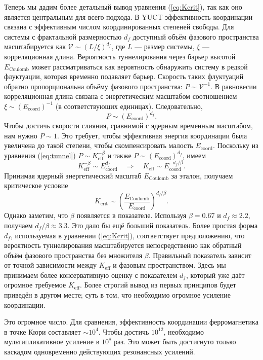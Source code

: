\documentclass[12pt]{article}
\theoremstyle{remark}
\newcommand{\Keff}{K_{\mathrm{eff}}}
\newcommand{\df}{d_{\!f}}
\newcommand{\Kcrit}{K_{\mathrm{crit}}}
\begin{document}
	Теперь мы дадим более детальный вывод уравнения (\ref{eq:Kcrit}), так как оно является центральным для всего подхода. В YUCT эффективность координации связана с эффективным числом координированных степеней свободы. Для системы с фрактальной размерностью \(\df\) доступный объём фазового пространства масштабируется как \(\mathcal{V} \sim (L/\xi)^{\df}\), где \(L\) — размер системы, \(\xi\) — корреляционная длина. Вероятность туннелирования через барьер высотой \(E_{\text{Coulomb}}\) может рассматриваться как вероятность обнаружить систему в редкой флуктуации, которая временно подавляет барьер. Скорость таких флуктуаций обратно пропорциональна объёму фазового пространства: \(P \sim \mathcal{V}^{-1}\). В равновесии корреляционная длина связана с энергетическим масштабом соотношением \(\xi \sim (E_{\mathrm{coord}})^{-1}\) (в соответствующих единицах). Следовательно,
	\[
	P \sim (E_{\mathrm{coord}})^{\df}.
	\]
	Чтобы достичь скорости слияния, сравнимой с ядерным временным масштабом, нам нужно \(P \sim 1\). Это требует, чтобы эффективная энергия координации была увеличена до такой степени, чтобы скомпенсировать малость \(E_{\mathrm{coord}}\). Поскольку из уравнения (\ref{eq:tunnel}) \(P \sim \Keff^{-\beta}\) и также \(P \sim (E_{\mathrm{coord}})^{\df}\), имеем
	\[
	\Keff^{-\beta} \sim E_{\mathrm{coord}}^{\df} \quad\Longrightarrow\quad \Keff \sim E_{\mathrm{coord}}^{-\df/\beta}.
	\]
	Принимая ядерный энергетический масштаб \(E_{\text{Coulomb}}\) за эталон, получаем критическое условие
	\[
	\Kcrit \sim \left( \frac{E_{\text{Coulomb}}}{E_{\mathrm{coord}}} \right)^{\df/\beta}.
	\]
	Однако заметим, что \(\beta\) появляется в показателе. Используя \(\beta = 0.67\) и \(\df \approx 2.2\), получаем \(\df/\beta \approx 3.3\). Это дало бы ещё больший показатель. Более простая форма \(\df\), используемая в уравнении (\ref{eq:Kcrit}), соответствует предположению, что вероятность туннелирования масштабируется непосредственно как обратный объём фазового пространства без множителя \(\beta\). Правильный показатель зависит от точной зависимости между \(\Keff\) и фазовым пространством. Здесь мы принимаем более консервативную оценку с показателем \(\df\), который уже даёт огромное требуемое \(\Keff\). Более строгий вывод из первых принципов будет приведён в другом месте; суть в том, что необходимо огромное усиление координации.
	
	Это огромное число. Для сравнения, эффективность координации ферромагнетика в точке Кюри составляет \(\sim 10^4\). Чтобы достичь \(10^{12}\), необходимо мультипликативное усиление в \(10^8\) раз. Это может быть достигнуто только каскадом одновременно действующих резонансных усилений.
	
\end{document}
